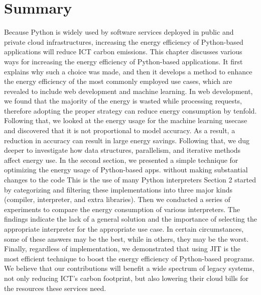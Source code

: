 
\clearpage
\section{Summary}
Because Python is widely used by software services deployed in public and private cloud infrastructures, increasing the energy efficiency of Python-based applications will reduce ICT carbon emissions.
This chapter discusses various ways for increasing the energy efficiency of Python-based applications. It first explains why such a choice was made, and then it develops a method to enhance the energy efficiency of the most commonly employed use cases, which are revealed to include web development and machine learning.
In web development, we found that the majority of the energy is wasted while processing requests, therefore adopting the proper strategy can reduce energy consumption by tenfold.
Following that, we looked at the energy usage for the machine learning usecase and discovered that it is not proportional to model accuracy.
As a result, a reduction in accuracy can result in large energy savings.
Following that, we dug deeper to investigate how data structures, parallelism, and iterative methods affect energy use.
In the second section, we presented a simple technique for optimizing the energy usage of Python-based apps. without making substantial changes to the code This is the use of many Python interpreters
Section 2 started by categorizing and filtering these implementations into three major kinds (compiler, interpreter, and extra libraries).
Then we conducted a series of experiments to compare the energy consumption of various interpreters.
The findings indicate the lack of a general solution and the importance of selecting the appropriate interpreter for the appropriate use case. In certain circumstances, some of these answers may be the best, while in others, they may be the worst.
Finally, regardless of implementation, we demonstrated that using JIT is the most efficient technique to boost the energy efficiency of Python-based programs.
We believe that our contributions will benefit a wide spectrum of legacy systems, not only reducing ICT's carbon footprint, but also lowering their cloud bills for the resources these services need.